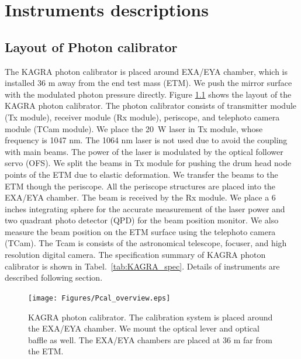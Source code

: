 
\chapter{Instruments descriptions} %

\label{Chapter3} %




\section{Layout of Photon calibrator}
The KAGRA photon calibrator is placed around EXA/EYA chamber, which is installed 36 m away from the end test mass (ETM). We push the mirror surface with the modulated photon pressure directly. Figure \ref{fig:Pcal_overview} shows the layout of the KAGRA photon calibrator. The photon calibrator consists of transmitter module (Tx module), receiver module (Rx module), periscope, and telephoto camera module (TCam module). We place the 20~W laser in Tx module, whose frequency is 1047 nm. The 1064 nm laser is not used due to avoid the coupling with main beams.   The power of the laser is modulated by the optical follower servo (OFS). We split the beams in Tx module for pushing the drum head node points of the ETM due to elastic deformation. We transfer the beams to the ETM though the periscope. All the periscope structures are placed into the EXA/EYA chamber. The beam is received by the Rx module. We place a 6 inches integrating sphere for the accurate measurement of the laser power and two quadrant photo detector (QPD) for the beam position monitor. We also measure the beam position on the ETM surface using the telephoto camera (TCam). The Tcam is consists of the astronomical telescope, focuser, and high resolution digital camera. The specification summary of KAGRA photon calibrator is shown in Tabel.~\ref{tab:KAGRA_spec}. Details of instruments are described following section.
\begin{figure}
\begin{center}
\texttt{[image: Figures/Pcal\_overview.eps]}
\caption{KAGRA photon calibrator. The calibration system is placed around the EXA/EYA chamber. We mount the optical lever and optical baffle as well. The EXA/EYA chambers are placed at 36 m far from the ETM.} 
\label{fig:Pcal_overview} 
\end{center}
\end{figure}

